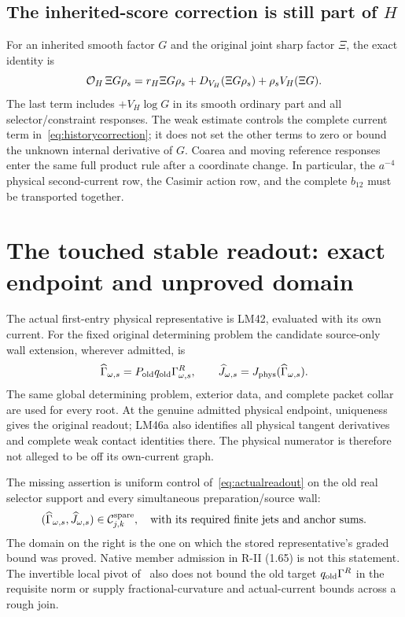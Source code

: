 \documentclass[11pt,letterpaper]{article}
\theoremstyle{plain}
\theoremstyle{remark}\newtheorem{remark}[theorem]{Scope}
\begin{document}
\subsection{The inherited-score correction is still part of $H$}

For an inherited smooth factor $G$ and the original joint sharp factor $\Xi$,
the exact identity is
\begin{equation}
\mathcal O_H\,\Xi G\rho_s
=r_H\Xi G\rho_s+D_{V_H}(\Xi G\rho_s)
+\rho_s V_H(\Xi G).
\label{eq:historycorrection}
\end{equation}
The last term includes $+V_H\log G$ in its smooth ordinary part and all
selector/constraint responses. The weak estimate controls the complete
current term in~\eqref{eq:historycorrection}; it does not set the other terms
to zero or bound the unknown internal derivative of $G$. Coarea and moving
reference responses enter the same full product rule after a coordinate
change. In particular, the $a^{-4}$ physical second-current row, the Casimir
action row, and the complete $b_{12}$ must be transported together.

\section{The touched stable readout: exact endpoint and unproved domain}
\label{sec:missing}

The actual first-entry physical representative is LM42, evaluated with its
own current. For the fixed original determining problem the candidate
source-only wall extension, wherever admitted, is
\begin{equation}
\widehat\Gamma_{\omega,s}=P_{\rm old}q_{\rm old}
\Gamma^R_{\omega,s},\qquad
\widehat J_{\omega,s}=J_{\rm phys}(\widehat\Gamma_{\omega,s}).
\label{eq:actualreadout}
\end{equation}
The same global determining problem, exterior data, and complete packet
collar are used for every root. At the genuine admitted physical endpoint,
uniqueness gives the original readout; LM46a also identifies all physical
tangent derivatives and complete weak contact identities there. The physical
numerator is therefore not alleged to be off its own-current graph.

The missing assertion is uniform control of~\eqref{eq:actualreadout} on the
old real selector support and every simultaneous preparation/source wall:
\begin{equation}
(\widehat\Gamma_{\omega,s},\widehat J_{\omega,s})
\in\mathcal C^{\rm spare}_{j,k},
\quad\text{with its required finite jets and anchor sums.}
\label{eq:admissiontarget}
\end{equation}
The domain on the right is the one on which the stored representative's
graded bound was proved. Native member admission in R-II (1.65) is not this
statement. The invertible local pivot of~\cite[\S5]{PW} also does not bound the old target
$q_{\rm old}\Gamma^R$ in the requisite norm or supply fractional-curvature
and actual-current bounds across a rough join.
\end{document}
